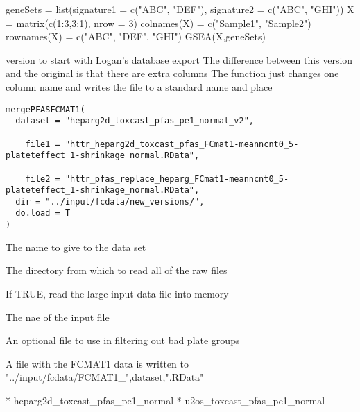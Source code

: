 \documentclass[letterpaper]{book}
\begin{document}
%
\begin{Examples}
\begin{ExampleCode}
geneSets = list(signature1 = c("ABC", "DEF"), signature2 = c("ABC", "GHI"))
X = matrix(c(1:3,3:1), nrow = 3)
colnames(X) = c("Sample1", "Sample2")
rownames(X) = c("ABC", "DEF", "GHI")
GSEA(X,geneSets)
\end{ExampleCode}
\end{Examples}
%
\begin{Description}\relax
version to start with Logan's database export
The difference between this version and the original is that there are extra columns
The function just changes one column name and writes the file to a standard name and place
\end{Description}
%
\begin{Usage}
\begin{verbatim}
mergePFASFCMAT1(
  dataset = "heparg2d_toxcast_pfas_pe1_normal_v2",
 
    file1 = "httr_heparg2d_toxcast_pfas_FCmat1-meanncnt0_5-plateteffect_1-shrinkage_normal.RData",
 
    file2 = "httr_pfas_replace_heparg_FCmat1-meanncnt0_5-plateteffect_1-shrinkage_normal.RData",
  dir = "../input/fcdata/new_versions/",
  do.load = T
)
\end{verbatim}
\end{Usage}
%
\begin{Arguments}
\begin{ldescription}
\item[\code{dataset}] The name to give to the data set

\item[\code{dir}] The directory from which to read all of the raw files

\item[\code{do.load}] If TRUE, read the large input data file into memory

\item[\code{infile}] The nae of the input file

\item[\code{pg.filter.file}] An optional file to use in filtering out bad plate groups
\end{ldescription}
\end{Arguments}
%
\begin{Value}
A file with the FCMAT1 data is written to "../input/fcdata/FCMAT1\_",dataset,".RData"

* heparg2d\_toxcast\_pfas\_pe1\_normal
* u2os\_toxcast\_pfas\_pe1\_normal
\end{Value}
\end{document}
